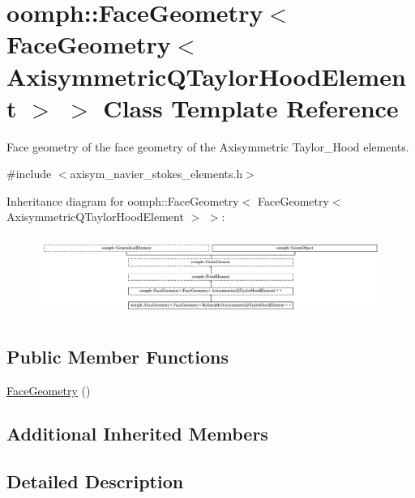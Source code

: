\hypertarget{classoomph_1_1FaceGeometry_3_01FaceGeometry_3_01AxisymmetricQTaylorHoodElement_01_4_01_4}{}\section{oomph\+:\+:Face\+Geometry$<$ Face\+Geometry$<$ Axisymmetric\+Q\+Taylor\+Hood\+Element $>$ $>$ Class Template Reference}
\label{classoomph_1_1FaceGeometry_3_01FaceGeometry_3_01AxisymmetricQTaylorHoodElement_01_4_01_4}


Face geometry of the face geometry of the Axisymmetric Taylor\+\_\+\+Hood elements.  




{\ttfamily \#include $<$axisym\+\_\+navier\+\_\+stokes\+\_\+elements.\+h$>$}

Inheritance diagram for oomph\+:\+:Face\+Geometry$<$ Face\+Geometry$<$ Axisymmetric\+Q\+Taylor\+Hood\+Element $>$ $>$\+:\begin{figure}[H]
\begin{center}
\leavevmode
\includegraphics[height=2.636535cm]{classoomph_1_1FaceGeometry_3_01FaceGeometry_3_01AxisymmetricQTaylorHoodElement_01_4_01_4}
\end{center}
\end{figure}
\subsection*{Public Member Functions}
\begin{DoxyCompactItemize}
\item 
\hyperlink{classoomph_1_1FaceGeometry_3_01FaceGeometry_3_01AxisymmetricQTaylorHoodElement_01_4_01_4_a7a02abe6f5ed3c814445b924e29f1cd2}{Face\+Geometry} ()
\end{DoxyCompactItemize}
\subsection*{Additional Inherited Members}


\subsection{Detailed Description}
